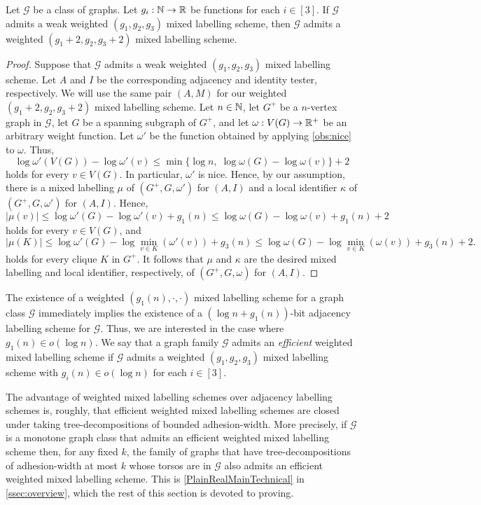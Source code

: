\documentclass{patmorin}
\renewcommand{\le}{\leqslant}
\renewcommand{\leq}{\leqslant}
\newcommand{\pat}[1]{\noindent\textcolor{Magenta}{PaMo: #1}}
\newcommand{\piotr}[1]{\noindent\textcolor{red}{PiMi: #1}}
\newcommand{\defin}[1]{\emph{\textcolor{brightmaroon}{#1}}}
\begin{document}
\begin{lem}
    \label{lem:nice_weights}
    Let $\mathcal{G}$ be a class of graphs.
    Let $g_i:\mathbb{N}\to\mathbb{R}$ be functions for each $i\in[3]$.
    If $\mathcal{G}$ admits a weak weighted $(g_1,g_2,g_3)$ mixed labelling scheme, then $\mathcal{G}$ admits a weighted $(g_1+2,g_2,g_3+2)$ mixed labelling scheme. %
\end{lem}
\begin{proof}
    Suppose that $\mathcal{G}$ admits a weak weighted $(g_1,g_2,g_3)$ mixed labelling scheme.
    Let $A$ and $I$ be the corresponding adjacency and identity tester, respectively.
    We will use the same pair $(A, M)$ for our weighted $(g_1+2,g_2,g_3+2)$ mixed labelling scheme.
    Let $n\in \mathbb{N}$, let $G^+$ be a  $n$-vertex graph in $\mathcal{G}$, let $G$ be a spanning subgraph of $G^+$, and let $\omega:V(G)\to \mathbb{R}^+$ be an arbitrary weight function.
    Let $\omega'$ be the function obtained by applying \cref{obs:nice} to $\omega$.
    Thus,
    \[
      \log\omega'(V(G))-\log\omega'(v)\le\min\{\log n,\;\log\omega(G)-\log\omega(v)\}+2
    \]
    holds for every $v\in V(G)$.
    In particular, $\omega'$ is nice.
    Hence, by our assumption, there is a mixed labelling $\mu$ of $(G^+,G,\omega')$ for $(A,I)$ and a local identifier $\kappa$ of $(G^+,G,\omega')$ for $(A,I)$.
    Hence,
    \[
    |\mu(v)| \leq \log \omega'(G) - \log\omega'(v) + g_1(n) \leq \log \omega(G) - \log\omega(v) + g_1(n) + 2
    \]
    holds for every $v\in V(G)$, and
    \[
    |\mu(K)|\le \log \omega'(G) - \log\min_{v\in K}(\omega'(v)) + g_3(n)
    \leq \log \omega(G) - \log\min_{v\in K}(\omega(v)) + g_3(n) + 2.
    \]
    holds for every clique $K$ in $G^+$.
    It follows that $\mu$ and  $\kappa$ are the desired  mixed labelling and local identifier, respectively,  of $(G^+,G,\omega)$ for $(A,I)$.
\end{proof}


The existence of a weighted $(g_1(n),\cdot,\cdot)$ mixed labelling scheme for a graph class $\mathcal{G}$ immediately implies the existence of a $(\log n+g_1(n))$-bit adjacency labelling scheme for $\mathcal{G}$. Thus, we are interested in the case where $g_1(n)\in o(\log n)$. We say that a graph family $\mathcal{G}$ admits an \defin{efficient} weighted mixed labelling scheme if $\mathcal{G}$ admits a weighted $(g_1,g_2,g_3)$ mixed labelling scheme with $g_i(n)\in o(\log n)$ for each $i\in [3]$.

The advantage of weighted mixed labelling schemes over adjacency labelling schemes is, roughly, that efficient weighted mixed labelling schemes are closed under taking tree-decompositions of bounded adhesion-width. More precisely, if $\mathcal{G}$ is a monotone graph class that admits an efficient weighted mixed labelling scheme then, for any fixed $k$, the family of graphs that have tree-decompositions of adhesion-width at most $k$ whose torsos are in $\mathcal{G}$ also admits an efficient weighted mixed labelling scheme. This is \cref{PlainRealMainTechnical} in \cref{ssec:overview}, which the rest of this section is devoted to proving.
\end{document}
